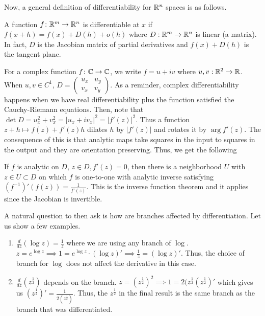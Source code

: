 \documentclass[11pt,leqno,oneside]{amsart}
\numberwithin{thm}{section}
\begin{document}
    Now, a general definition of differentiability for ${\mathbb R}^n$ spaces is as
    follows.
    \begin{defn}
        A function $f\colon {\mathbb R}^m \to {\mathbb R}^n$ is differentiable at $x$ if $f(x+h) =
        f(x)+D(h)+o(h)$ where $D: {\mathbb R}^m \to {\mathbb R}^n$ is linear (a matrix). In fact,
        $D$ is the Jacobian matrix of partial derivatives and $f(x)+D(h)$ is
        the tangent plane.
    \end{defn}
    For a complex function $f\colon {\mathbb C} \to {\mathbb C}$, we write $f = u+iv$ where $u,v: {\mathbb R}^2
    \to {\mathbb R}$. When $u,v \in C^1$, $D = \left( \begin{array}{cc}
        u_x & u_y \\
        v_x & v_y
    \end{array}\right)$. As a reminder, complex differentiability happens when
    we have real differentiability plus the function satisfied the
    Cauchy-Riemann equations. Then, note that $\det D = u_x^2 + v_x^2 =
    |u_x+iv_x|^2 = |f'(z)|^2$. Thus a function $z+h \mapsto f(z) + f'(z)h$
    dilates $h$ by $|f'(z)|$ and rotates it by $\arg f'(z)$. The consequence of
    this is that analytic maps take squares in the input to squares in the
    output and they are orientation preserving. Thus, we get the following
    \begin{rmk}
        If $f$ is analytic on $D$, $z \in D, f'(z) = 0$, then there is a
        neighborhood $U$ with $z \in U \subset D$ on which $f$ is one-to-one
        with analytic inverse satisfying $(f^{-1})'(f(z)) = \frac{1}{f'(z)}$.
        This is the inverse function theorem and it applies since the Jacobian
        is invertible.
    \end{rmk}
    A natural question to then ask is how are branches affected by
    differentiation. Let us show a few examples.
    \begin{example}
        \begin{enumerate}
            \item $\frac{d}{dz}(\log z) = \frac{1}{z}$ where we are using any
                branch of $\log$. $z = e^{\log z} \implies 1 = e^{\log z} \cdot
                (\log z)' \implies \frac{1}{z} = (\log z)'$. Thus, the choice
                of branch for $\log$ does not affect the derivative in this
                case.
            \item $\frac{d}{dz}(z^{\frac{1}{2}})$ depends on the branch. $z =
                (z^{\frac{1}{2}})^2 \implies 1 =
                2(z^{\frac{1}{2}}(z^{\frac{1}{2}})'$ which gives us
                $(z^{\frac{1}{2}})' = \frac{1}{2(z^\frac{1}{2})}$. Thus, the
                $z^\frac{1}{2}$ in the final result is the same branch as the
                branch that was differentiated.
        \end{enumerate}
    \end{example}
\end{document}
